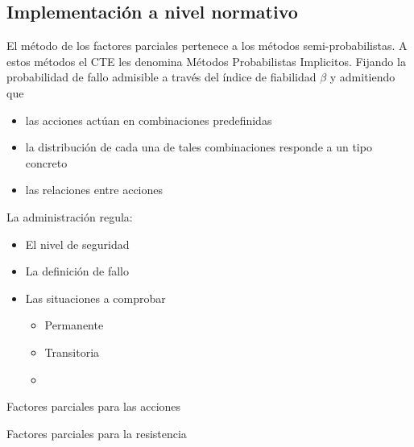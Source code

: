 \subsection{Implementación a nivel normativo}
El método de los factores parciales pertenece a los métodos semi-probabilistas. A estos métodos el CTE les denomina Métodos Probabilistas Implicitos. Fijando la probabilidad de fallo admisible a través del índice de fiabilidad $\beta$ y admitiendo que
\begin{itemize}
    \item las acciones actúan en combinaciones predefinidas
    \item la distribución de cada una de tales combinaciones responde a un tipo concreto 
    \item las relaciones entre acciones 
\end{itemize}

La administración regula:
\begin{itemize}
    \item El nivel de seguridad
    \item La definición de fallo
    \item Las situaciones a comprobar
    \begin{itemize}
        \item Permanente
        \item Transitoria
        \item 
    \end{itemize}
\end{itemize}

Factores parciales para las acciones

Factores parciales para la resistencia